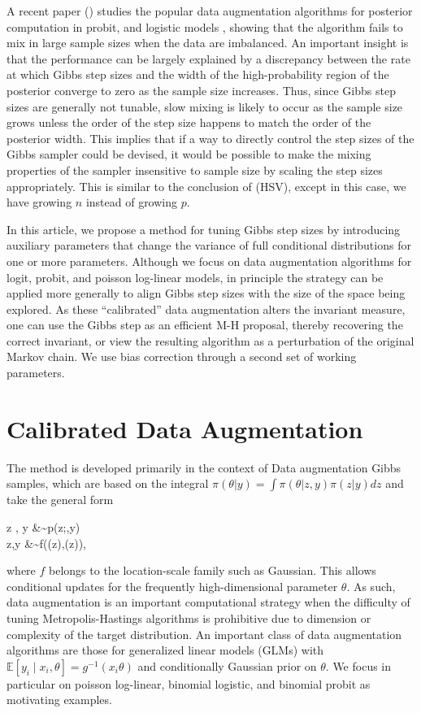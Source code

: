 \documentclass[10pt]{article}
\newcommand{\be}{\begin{equs}}
\newcommand{\ee}{\end{equs}}
\newcommand{\bb}[1]{\mathbb{#1}}
\begin{document}
A recent paper (\cite{johndrow2016inefficiency}) studies the popular data augmentation algorithms for posterior computation in probit, \citep{albert1993bayesian} and logistic models \citep{polson2013bayesian}, showing that the algorithm fails to mix in large sample sizes when the data are imbalanced. An important insight is that the performance can be largely explained by a discrepancy between the rate at which Gibbs step sizes and the width of the high-probability region of the posterior converge to zero as the sample size increases. Thus, since Gibbs step sizes are generally not tunable, slow mixing is likely to occur as the sample size grows unless the order of the step size happens to match the order of the posterior width. This implies that if a way to directly control the step sizes of the Gibbs sampler could be devised, it would be possible to make the mixing properties of the sampler insensitive to sample size by scaling the step sizes appropriately. This is similar to the conclusion of (HSV), except in this case, we have growing $n$ instead of growing $p$.

In this article, we propose a method for tuning Gibbs step sizes by introducing auxiliary parameters that change the variance of full conditional distributions for one or more parameters. Although we focus on data augmentation algorithms for logit, probit, and poisson log-linear models, in principle the strategy can be applied more generally to align Gibbs step sizes with the size of the space being explored. As these ``calibrated'' data augmentation alters the invariant measure, one can use the Gibbs step as an efficient M-H proposal, thereby recovering the correct invariant, or view the resulting algorithm as a perturbation of the original Markov chain. We use bias correction through a second set of working parameters.

\section{Calibrated Data Augmentation}
The method is developed primarily in the context of Data augmentation Gibbs samples, which are based on the integral $ \pi(\theta|y)=\int\pi(\theta|z,y)\pi(z|y) dz$ and take the general form
\be \label{eq:da}
z \mid \theta, y &\sim p(z;\theta,y) \\
\theta \mid z,y &\sim f(\mu(z),\Sigma(z)),
\ee
where $f$ belongs to the location-scale family such as Gaussian. This allows conditional updates for the frequently high-dimensional parameter $\theta$. As such, data augmentation is an important computational strategy when the difficulty of tuning Metropolis-Hastings algorithms is prohibitive due to dimension or complexity of the target distribution. An important class of data augmentation algorithms are those for generalized linear models (GLMs) with $\bb E[y_i \mid x_i, \theta] = g^{-1}(x_i \theta)$ and conditionally Gaussian prior on $\theta$. We focus in particular on poisson log-linear, binomial logistic, and binomial probit as motivating examples.
\end{document}

